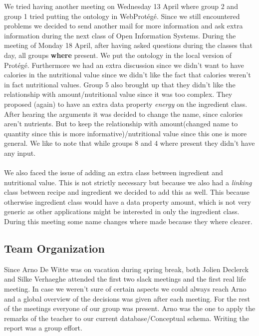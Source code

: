 \noindent
We tried having another meeting on Wednesday 13 April where group 2 and group 1 tried putting the ontology in WebProtégé. Since we still encountered problems we decided to send another mail for more information and ask extra information during the next class of Open Information Systems. 
\newline
\newline
\noindent
During the meeting of Monday 18 April, after having asked questions during the classes that day, all groups \textbf{where} present. We put the ontology in the local version of Protégé. Furthermore we had an extra discussion since we didn't want to have calories in the nutritional value since we didn't like the fact that calories weren't in fact nutritional values. Group 5 also brought up that they didn't like the relationship with amount/nutritional value since it was too complex. They proposed (again) to have an extra data property \emph{energy} on the ingredient class. After hearing the arguments it was decided to change the name, since calories aren't nutrients. But to keep the relationship with amount(changed name to quantity since this is more informative)/nutritional value since this one is more general. We like to note that while groups 8 and 4 where present they didn't have any input.\\ \\
We also faced the issue of adding an extra class between ingredient and nutritional value. This is not strictly necessary but because we also had a \emph{linking} class between recipe and ingredient we decided to add this as well. This because otherwise ingredient class would have a data property amount, which is not very generic as other applications might be interested in only the ingredient class. During this meeting some name changes where made because they where clearer.

\subsection{Team Organization}

Since Arno De Witte was on vacation during spring break, both Jolien Declerck and Silke Verhaeghe attended the first two slack meetings and the first real life meeting. In case we weren't sure of certain aspects we could always reach Arno and a global overview of the decisions was given after each meeting. For the rest of the meetings everyone of our group was present. Arno was the one to apply the remarks of the teacher to our current database/Conceptual schema. Writing the report was a group effort. 

